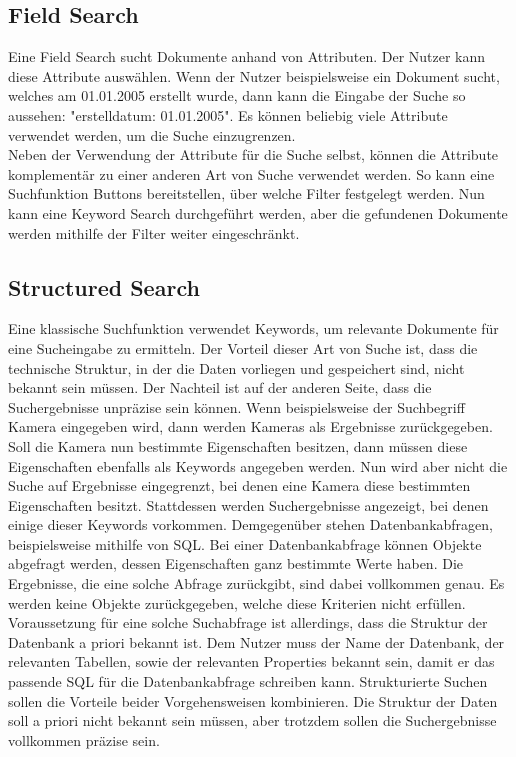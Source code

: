 \subsection{Field Search}
Eine Field Search sucht Dokumente anhand von Attributen.
Der Nutzer kann diese Attribute auswählen.
Wenn der Nutzer beispielsweise ein Dokument sucht, welches am 01.01.2005 erstellt wurde, dann kann die Eingabe der Suche so aussehen: "erstelldatum: 01.01.2005".
Es können beliebig viele Attribute verwendet werden, um die Suche einzugrenzen.\\

Neben der Verwendung der Attribute für die Suche selbst, können die Attribute komplementär zu einer anderen Art von Suche verwendet werden.
So kann eine Suchfunktion Buttons bereitstellen, über welche Filter festgelegt werden.
Nun kann eine Keyword Search durchgeführt werden, aber die gefundenen Dokumente werden mithilfe der Filter weiter eingeschränkt.

\subsection{Structured Search}
Eine klassische Suchfunktion verwendet Keywords, um relevante Dokumente für eine Sucheingabe zu ermitteln.
Der Vorteil dieser Art von Suche ist, dass die technische Struktur, in der die Daten vorliegen und gespeichert sind, nicht bekannt sein müssen.
Der Nachteil ist auf der anderen Seite, dass die Suchergebnisse unpräzise sein können.
Wenn beispielsweise der Suchbegriff Kamera eingegeben wird, dann werden Kameras als Ergebnisse zurückgegeben.
Soll die Kamera nun bestimmte Eigenschaften besitzen, dann müssen diese Eigenschaften ebenfalls als Keywords angegeben werden.
Nun wird aber nicht die Suche auf Ergebnisse eingegrenzt, bei denen eine Kamera diese bestimmten Eigenschaften besitzt.
Stattdessen werden Suchergebnisse angezeigt, bei denen einige dieser Keywords vorkommen.
Demgegenüber stehen Datenbankabfragen, beispielsweise mithilfe von SQL.
Bei einer Datenbankabfrage können Objekte abgefragt werden, dessen Eigenschaften ganz bestimmte Werte haben.
Die Ergebnisse, die eine solche Abfrage zurückgibt, sind dabei vollkommen genau.
Es werden keine Objekte zurückgegeben, welche diese Kriterien nicht erfüllen.
Voraussetzung für eine solche Suchabfrage ist allerdings, dass die Struktur der Datenbank a priori bekannt ist.
Dem Nutzer muss der Name der Datenbank, der relevanten Tabellen, sowie der relevanten Properties bekannt sein, damit er das passende SQL für die Datenbankabfrage schreiben kann.
Strukturierte Suchen sollen die Vorteile beider Vorgehensweisen kombinieren.
Die Struktur der Daten soll a priori nicht bekannt sein müssen, aber trotzdem sollen die Suchergebnisse vollkommen präzise sein.

